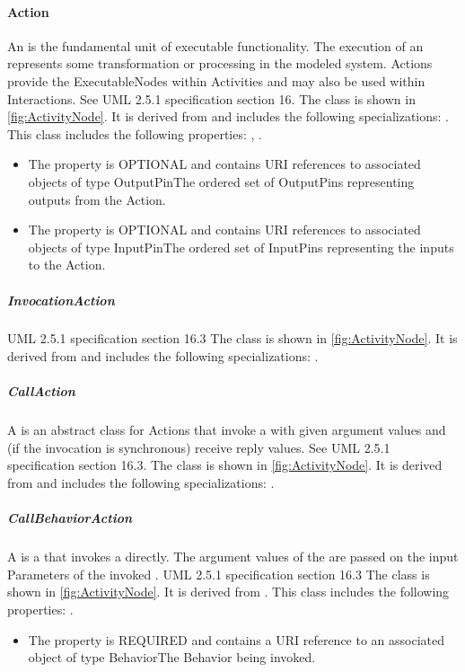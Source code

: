 \paragraph{Action}%
\label{sec:uml:Action}%
An  is the fundamental unit of executable functionality. The execution of an  represents some transformation or processing in the modeled system. Actions provide the ExecutableNodes within Activities and may also be used within Interactions. See UML 2.5.1 specification section 16.%
\newline%
\linebreak%
The  class is shown in \ref{fig:ActivityNode}. It is derived from  and includes the following specializations: . %
This class includes the following properties: , . %
\begin{itemize}%
\item%
The  property is OPTIONAL and contains URI references to associated objects of type OutputPinThe ordered set of OutputPins representing outputs from the Action.%
\item%
The  property is OPTIONAL and contains URI references to associated objects of type InputPinThe ordered set of InputPins representing the inputs to the Action.%
\end{itemize}%
\subparagraph{InvocationAction}%
\label{sec:uml:InvocationAction}%
UML 2.5.1 specification section 16.3%
\newline%
\linebreak%
The  class is shown in \ref{fig:ActivityNode}. It is derived from  and includes the following specializations: . %
%
\subparagraph{CallAction}%
\label{sec:uml:CallAction}%
A  is an abstract class for Actions that invoke a  with given argument values and (if the invocation is synchronous) receive reply values. See UML 2.5.1 specification section 16.3.%
\newline%
\linebreak%
The  class is shown in \ref{fig:ActivityNode}. It is derived from  and includes the following specializations: . %
%
\subparagraph{CallBehaviorAction}%
\label{sec:uml:CallBehaviorAction}%
A  is a  that invokes a  directly. The argument values of the  are passed on the input Parameters of the invoked . UML 2.5.1 specification section 16.3%
\newline%
\linebreak%
The  class is shown in \ref{fig:ActivityNode}. It is derived from .%
This class includes the following properties: . %
\begin{itemize}%
\item%
The  property is REQUIRED and contains a URI reference to an associated object of type BehaviorThe Behavior being invoked.%
\end{itemize}%
